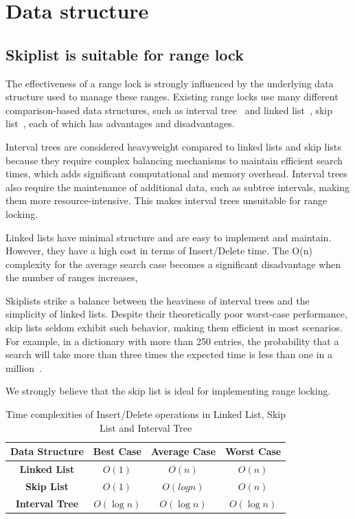 \chapter{Data structure}\label{ch:data-structure}

\section{Skiplist is suitable for range lock}
The effectiveness of a range lock is strongly influenced by the underlying data structure used to manage these ranges. 
Existing range locks use many different comparison-based data structures, such as interval tree~\parencite{linuxRangeLockImpl2013, kim2019pnova} and linked list~\parencite{song2013parallelizing}, skip list~\parencite{kogan2020scalable}, each of which has advantages and disadvantages. 

Interval trees are considered heavyweight compared to linked lists and skip lists because they require complex balancing mechanisms to maintain efficient search times, which adds significant computational and memory overhead. 
Interval trees also require the maintenance of additional data, such as subtree intervals, making them more resource-intensive. This makes interval trees unsuitable for range locking. 

Linked lists have minimal structure and are easy to implement and maintain. However, they have a high cost in terms of Insert/Delete time. The O(n) complexity for the average search case becomes a significant disadvantage when the number of ranges increases, 

Skiplists strike a balance between the heaviness of interval trees and the simplicity of linked lists. Despite their theoretically poor worst-case performance, skip lists seldom exhibit such behavior, making them efficient in most scenarios.
For example, in a dictionary with more than 250 entries, the probability that a search will take more than three times the expected time is less than one in a million~\parencite{pugh1990skip2}. 

We strongly believe that the skip list is ideal for implementing range locking.

\begin{table}[h!]
    \centering
    \begin{tabular}{|c|c|c|c|}
        \hline
        \textbf{Data Structure} & \textbf{Best Case} & \textbf{Average Case} & \textbf{Worst Case} \\ \hline
        \textbf{Linked List} & $O(1)$ & $O(n)$ & $O(n)$ \\ \hline
        \textbf{Skip List} & $O(1)$ & $O(logn)$ & $O(n)$ \\ \hline
        \textbf{Interval Tree} & $O(\log n)$ & $O(\log n)$ & $O(\log n)$ \\ \hline
    \end{tabular}
    \caption{Time complexities of Insert/Delete operations in Linked List, Skip List and Interval Tree}
    \label{tab:insertdeletecomplexity}
\end{table}


